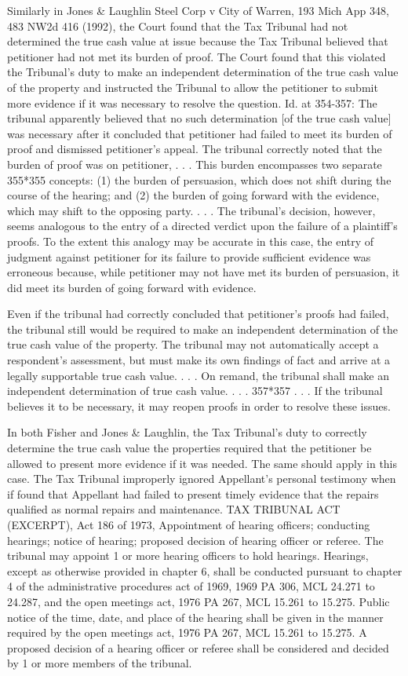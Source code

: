 Similarly in Jones & Laughlin Steel Corp v City of Warren, 193 Mich App 348, 483 NW2d 416 (1992), the Court found that the Tax Tribunal had not determined the true cash value at issue because the Tax Tribunal believed that petitioner had not met its burden of proof. The Court found that this violated the Tribunal's duty to make an independent determination of the true cash value of the property and instructed the Tribunal to allow the petitioner to submit more evidence if it was necessary to resolve the question. Id. at 354-357:
The tribunal apparently believed that no such determination [of the true cash value] was necessary after it concluded that petitioner had failed to meet its burden of proof and dismissed petitioner's appeal. The tribunal correctly noted that the burden of proof was on petitioner, . . .  This burden encompasses two separate 355*355 concepts: (1) the burden of persuasion, which does not shift during the course of the hearing; and (2) the burden of going forward with the evidence, which may shift to the opposing party. . . . The tribunal's decision, however, seems analogous to the entry of a directed verdict upon the failure of a plaintiff's proofs. To the extent this analogy may be accurate in this case, the entry of judgment against petitioner for its failure to provide sufficient evidence was erroneous because, while petitioner may not have met its burden of persuasion, it did meet its burden of going forward with evidence.
 
Even if the tribunal had correctly concluded that petitioner's proofs had failed, the tribunal still would be required to make an independent determination of the true cash value of the property. The tribunal may not automatically accept a respondent's assessment, but must make its own findings of fact and arrive at a legally supportable true cash value. . . . On remand, the tribunal shall make an independent determination of true cash value. . . . 357*357 . . . If the tribunal believes it to be necessary, it may reopen proofs in order to resolve these issues.
 
	In both Fisher and Jones & Laughlin, the Tax Tribunal's duty to correctly determine the true cash value the properties required that the petitioner be allowed to present more evidence if it was needed. The same should apply in this case. 
The Tax Tribunal improperly ignored Appellant's personal testimony when if found that Appellant had failed to present timely evidence that the repairs qualified as normal repairs and maintenance.
TAX TRIBUNAL ACT (EXCERPT), Act 186 of 1973,  Appointment of hearing officers; conducting hearings; notice of hearing; proposed decision of hearing officer or referee.
The tribunal may appoint 1 or more hearing officers to hold hearings. Hearings, except as otherwise provided in chapter 6, shall be conducted pursuant to chapter 4 of the administrative procedures act of 1969, 1969 PA 306, MCL 24.271 to 24.287, and the open meetings act, 1976 PA 267, MCL 15.261 to 15.275. Public notice of the time, date, and place of the hearing shall be given in the manner required by the open meetings act, 1976 PA 267, MCL 15.261 to 15.275. A proposed decision of a hearing officer or referee shall be considered and decided by 1 or more members of the tribunal.
 
